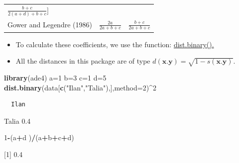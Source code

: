 \documentclass[
]{article}
\newenvironment{Shaded}{\begin{snugshade}}{\end{snugshade}}
\newcommand{\DataTypeTok}[1]{\textcolor[rgb]{0.13,0.29,0.53}{#1}}
\newcommand{\DecValTok}[1]{\textcolor[rgb]{0.00,0.00,0.81}{#1}}
\newcommand{\KeywordTok}[1]{\textcolor[rgb]{0.13,0.29,0.53}{\textbf{#1}}}
\newcommand{\NormalTok}[1]{#1}
\newcommand{\OperatorTok}[1]{\textcolor[rgb]{0.81,0.36,0.00}{\textbf{#1}}}
\newcommand{\StringTok}[1]{\textcolor[rgb]{0.31,0.60,0.02}{#1}}
\begin{document}
\begin{longtable}[]{@{}lcc@{}}
\begin{minipage}[t]{0.33\columnwidth}
\(\frac{b+c}{2(a+d)+b+c}]\)\strut
\end{minipage}\tabularnewline
\begin{minipage}[t]{0.26\columnwidth}\raggedright
Gower and Legendre (1986)\strut
\end{minipage} & \begin{minipage}[t]{0.33\columnwidth}\centering
\(\frac{2a}{2a+b+c}\)\strut
\end{minipage} & \begin{minipage}[t]{0.33\columnwidth}\centering
\(\frac{b+c}{2a+b+c}\)\strut
\end{minipage}\tabularnewline
\bottomrule
\end{longtable}

\begin{itemize}
\item
  To calculate these coefficients, we use the function:
  \href{https://www.rdocumentation.org/packages/ade4/versions/1.7-16/topics/dist.binary}{dist.binary().}
\item
  All the distances in this package are of type
  \(d(\mathbf{x}.\mathbf{y})= \sqrt{1 - s(\mathbf{x}.\mathbf{y})}\).
\end{itemize}

\begin{Shaded}
\begin{Highlighting}[]
\KeywordTok{library}\NormalTok{(ade4)}
\NormalTok{a=}\DecValTok{1}
\NormalTok{b=}\DecValTok{3}
\NormalTok{c=}\DecValTok{1}
\NormalTok{d=}\DecValTok{5}
\KeywordTok{dist.binary}\NormalTok{(data[}\KeywordTok{c}\NormalTok{(}\StringTok{"Ilan"}\NormalTok{,}\StringTok{"Talia"}\NormalTok{),],}\DataTypeTok{method=}\DecValTok{2}\NormalTok{)}\OperatorTok{^}\DecValTok{2}
\end{Highlighting}
\end{Shaded}

\begin{verbatim}
  Ilan
\end{verbatim}

Talia 0.4

\begin{Shaded}
\begin{Highlighting}[]
\DecValTok{1}\OperatorTok{-}\NormalTok{(a}\OperatorTok{+}\NormalTok{d )}\OperatorTok{/}\NormalTok{(a}\OperatorTok{+}\NormalTok{b}\OperatorTok{+}\NormalTok{c}\OperatorTok{+}\NormalTok{d)}
\end{Highlighting}
\end{Shaded}

{[}1{]} 0.4
\end{document}
